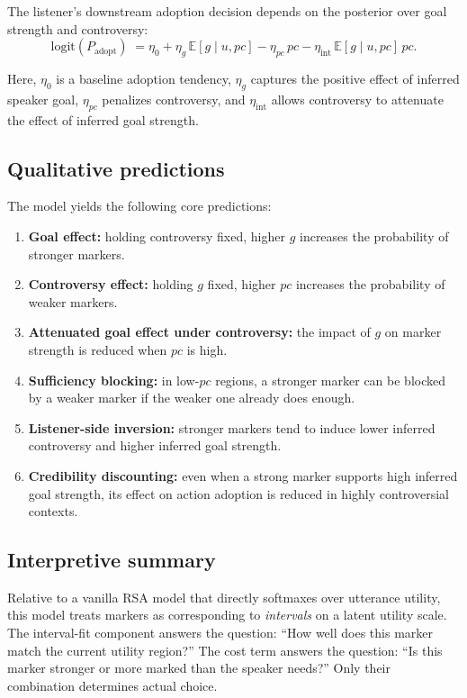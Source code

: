 \documentclass[12pt]{article}
\begin{document}
The listener's downstream adoption decision depends on the posterior over goal
strength and controversy:
\begin{equation}
\text{logit}\left(P_{\mathrm{adopt}}\right)
\;=
\eta_0
+ \eta_g\,\mathbb{E}[g \mid u,pc]
- \eta_{pc}\,pc
- \eta_{\mathrm{int}}\,\mathbb{E}[g \mid u,pc]\,pc.
\label{eq:model-adopt}
\end{equation}

Here, $\eta_0$ is a baseline adoption tendency, $\eta_g$ captures the positive
effect of inferred speaker goal, $\eta_{pc}$ penalizes controversy, and
$\eta_{\mathrm{int}}$ allows controversy to attenuate the effect of inferred
goal strength.

\subsection{Qualitative predictions}

The model yields the following core predictions:
\begin{enumerate}
  \item \textbf{Goal effect:} holding controversy fixed, higher $g$ increases
        the probability of stronger markers.
  \item \textbf{Controversy effect:} holding $g$ fixed, higher $pc$ increases
        the probability of weaker markers.
  \item \textbf{Attenuated goal effect under controversy:} the impact of $g$
        on marker strength is reduced when $pc$ is high.
  \item \textbf{Sufficiency blocking:} in low-$pc$ regions, a stronger marker
        can be blocked by a weaker marker if the weaker one already does enough.
  \item \textbf{Listener-side inversion:} stronger markers tend to induce lower
        inferred controversy and higher inferred goal strength.
  \item \textbf{Credibility discounting:} even when a strong marker supports
        high inferred goal strength, its effect on action adoption is reduced
        in highly controversial contexts.
\end{enumerate}

\subsection{Interpretive summary}

Relative to a vanilla RSA model that directly softmaxes over utterance utility,
this model treats markers as corresponding to \emph{intervals} on a latent
utility scale. The interval-fit component answers the question:
\enquote{How well does this marker match the current utility region?}
The cost term answers the question:
\enquote{Is this marker stronger or more marked than the speaker needs?}
Only their combination determines actual choice.
\end{document}
